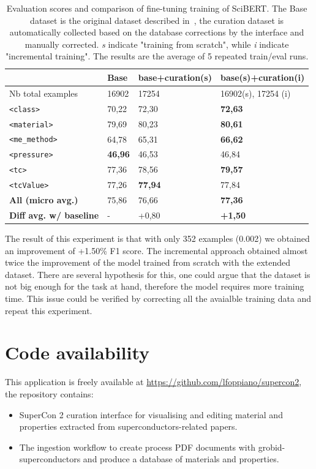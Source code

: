 \documentclass[a4paper]{article}
\begin{document}
\begin{table}[h]
\centering
\begin{tabular}{|l|l|l|l|}
\hline
& \textbf{Base} & \textbf{base+curation(s)} & \textbf{base(s)+curation(i)} \\ 
\hline
\hline
Nb total examples & 16902 & 17254 & 16902(s), 17254 (i)\\ 
\hline
\texttt{<class>}        & 70,22             & 72,30             & \textbf{72,63} \\ 
\texttt{<material>}     & 79,69             & 80,23             & \textbf{80,61} \\ 
\texttt{<me\_method>}   & 64,78             & 65,31             & \textbf{66,62} \\ 
\texttt{<pressure>}     & \textbf{46,96}    & 46,53             & 46,84 \\ 
\texttt{<tc>}           & 77,36             & 78,56             & \textbf{79,57} \\ 
\texttt{<tcValue>}      & 77,26             & \textbf{77,94}    & 77,84 \\ 
\hline
\textbf{All (micro avg.)} & 75,86           & 76,66             & \textbf{77,36} \\ 
\hline
\textbf{Diff avg. w/ baseline}& -           & +0,80             & \textbf{+1,50} \\ 
\hline
\end{tabular}
\caption{Evaluation scores and comparison of fine-tuning training of SciBERT. The Base dataset is the original dataset described in~\cite{lfoppiano2023automatic}, the curation dataset is automatically collected based on the database corrections by the interface and manually corrected. \textit{s} indicate "training from scratch", while \textit{i} indicate "incremental training". The results are the average of 5 repeated train/eval runs. }
\label{tab:evaluation-curation-training}
\end{table}

The result of this experiment is that with only 352 examples (0.002) we obtained an improvement of +1.50\% F1 score. The incremental approach obtained almost twice the improvement of the model trained from scratch with the extended dataset. 
There are several hypothesis for this, one could argue that the dataset is not big enough for the task at hand, therefore the model requires more training time. This issue could be verified by correcting all the avaialble training data and repeat this experiment. 


\section{Code availability}
This application is freely available at \url{https://github.com/lfoppiano/supercon2}, the repository contains:
\begin{itemize}
\item SuperCon 2 curation interface for visualising and editing material and properties extracted from superconductors-related papers.
\item The ingestion workflow to create process PDF documents with grobid-superconductors and produce a database of materials and properties.
\end{itemize}
\end{document}

